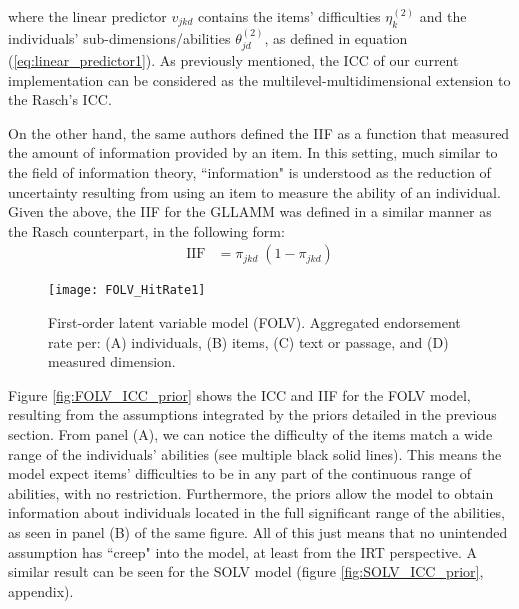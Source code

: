\noindent where the linear predictor $v_{jkd}$ contains the items' difficulties $\eta^{(2)}_{k}$ and the individuals' sub-dimensions/abilities $\theta^{(2)}_{jd}$, as defined in equation (\ref{eq:linear_predictor1}). As previously mentioned, the ICC of our current implementation can be considered as the multilevel-multidimensional extension to the Rasch's ICC.

On the other hand, the same authors defined the IIF as a function that measured the amount of information provided by an item. In this setting, much similar to the field of information theory, ``information" is understood as the reduction of uncertainty resulting from using an item to measure the ability of an individual. Given the above, the IIF for the GLLAMM was defined in a similar manner as the Rasch counterpart, in the following form:
%
\begin{equation} \label{eq:IIF}
	\begin{split}
		\text{IIF} &= \pi_{jkd} \; (1 - \pi_{jkd})
	\end{split}	
\end{equation}
%
\begin{figure}[H]
	\centering
	\texttt{[image: FOLV\_HitRate1]}
	\caption[First-order latent variable model (FOLV). Hit rate per dimensions of interest.]%
	{First-order latent variable model (FOLV). Aggregated endorsement rate per: (A) individuals, (B) items, (C) text or passage, and (D) measured dimension.}
	\label{fig:FOLV_hitrate1}
\end{figure}

Figure \ref{fig:FOLV_ICC_prior} shows the ICC and IIF for the FOLV model, resulting from the assumptions integrated by the priors detailed in the previous section. From panel (A), we can notice the difficulty of the items match a wide range of the individuals' abilities (see multiple black solid lines). This means the model expect items' difficulties to be in any part of the continuous range of abilities, with no restriction. Furthermore, the priors allow the model to obtain information about individuals located in the full significant range of the abilities, as seen in panel (B) of the same figure. All of this just means that no unintended assumption has ``creep" into the model, at least from the IRT perspective. A similar result can be seen for the SOLV model (figure \ref{fig:SOLV_ICC_prior}, appendix).

